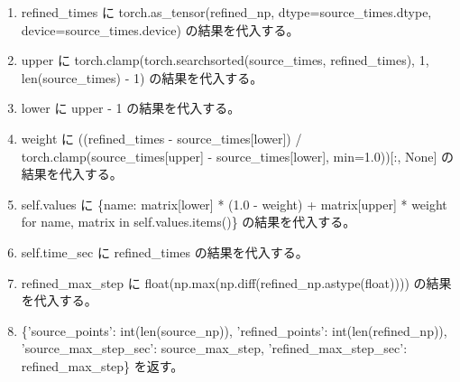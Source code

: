 \documentclass[a4paper,11pt]{article}
\begin{document}
\begin{enumerate}[leftmargin=1.8em]
\item refined\_times に torch.as\_tensor(refined\_np, dtype=source\_times.dtype, device=source\_times.device) の結果を代入する。
\item upper に torch.clamp(torch.searchsorted(source\_times, refined\_times), 1, len(source\_times) - 1) の結果を代入する。
\item lower に upper - 1 の結果を代入する。
\item weight に ((refined\_times - source\_times[lower]) / torch.clamp(source\_times[upper] - source\_times[lower], min=1.0))[:, None] の結果を代入する。
\item self.values に \{name: matrix[lower] * (1.0 - weight) + matrix[upper] * weight for name, matrix in self.values.items()\} の結果を代入する。
\item self.time\_sec に refined\_times の結果を代入する。
\item refined\_max\_step に float(np.max(np.diff(refined\_np.astype(float)))) の結果を代入する。
\item \{'source\_points': int(len(source\_np)), 'refined\_points': int(len(refined\_np)), 'source\_max\_step\_sec': source\_max\_step, 'refined\_max\_step\_sec': refined\_max\_step\} を返す。
            \end{enumerate}
\end{document}
